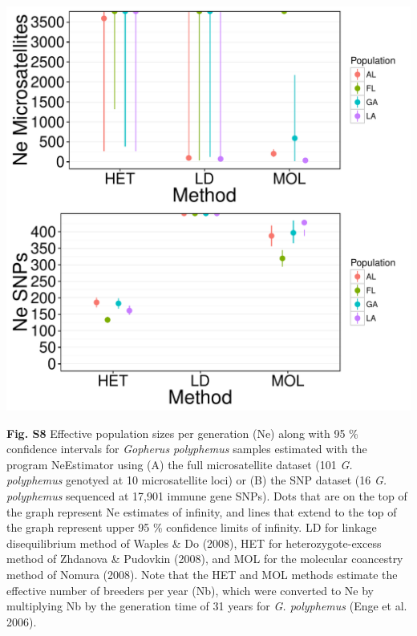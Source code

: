 \documentclass[english]{article}\usepackage[]{graphicx}\usepackage[]{color}
\makeatletter
\def\maxwidth{ %
  \ifdim\Gin@nat@width>\linewidth
    \linewidth
  \else
    \Gin@nat@width
  \fi
}
\newenvironment{knitrout}{}{} %
\makeatother
\begin{document}
\begin{knitrout}
\color{fgcolor}
\includegraphics[width=\maxwidth]{figure/Figure_S8-1} 

\end{knitrout}
\noindent
\textbf{Fig. S8} Effective population sizes per generation (Ne) along with 95 \% confidence intervals for \textit{Gopherus polyphemus} samples estimated with the program NeEstimator using (A) the full microsatellite dataset (101 \textit{G. polyphemus} genotyed at 10 microsatellite loci) or (B) the SNP dataset (16 \textit{G. polyphemus} sequenced at 17,901 immune gene SNPs). Dots that are on the top of the graph represent Ne estimates of infinity, and lines that extend to the top of the graph represent upper 95 \% confidence limits of infinity. LD for linkage disequilibrium method of Waples \& Do (2008), HET for heterozygote-excess method of Zhdanova \& Pudovkin (2008), and MOL for the molecular coancestry method of Nomura (2008). Note that the HET and MOL methods estimate the effective number of breeders per year (Nb), which were converted to Ne by multiplying Nb by the generation time of 31 years for \textit{G. polyphemus} (Enge et al. 2006).\\
\end{document}
